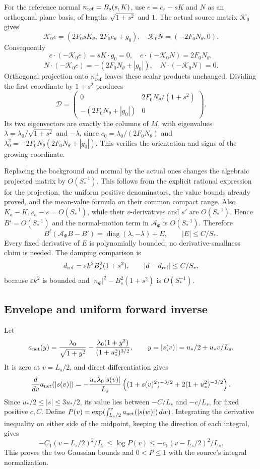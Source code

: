 \documentclass[10pt,a4paper]{article}
\begin{document}
For the reference normal \(n_{\rm ref}=B_s(s,K)\), use \(e=e_r-sK\) and \(N\) as an orthogonal plane basis, of lengths \(\sqrt{1+s^2}\) and \(1\). The actual source matrix \(\mathcal K_0\) gives \[
\mathcal K_0e=(2F_0sK_\theta,\ 2F_0e_\theta+g_0),\quad
\mathcal K_0N=(-2F_0N_\theta,0).
\] Consequently \[
e\cdot(-\mathcal K_0e)=sK\cdot g_0=0,\quad
e\cdot(-\mathcal K_0N)=2F_0N_\theta,
\] \[
N\cdot(-\mathcal K_0e)=-(2F_0N_\theta+|g_0|),\quad
N\cdot(-\mathcal K_0N)=0.
\] Orthogonal projection onto \(n_{\rm ref}^\perp\) leaves these scalar products unchanged. Dividing the first coordinate by \(1+s^2\) produces \[
\mathcal D=
\begin{pmatrix}
0&2F_0N_\theta/(1+s^2)\\
-(2F_0N_\theta+|g_0|)&0
\end{pmatrix}.
\] Its two eigenvectors are exactly the columns of \(M\), with eigenvalues \(\lambda=\lambda_0/\sqrt{1+s^2}\) and \(-\lambda\), since \(c_0=\lambda_0/(2F_0N_\theta)\) and \(\lambda_0^2=-2F_0N_\theta(2F_0N_\theta+|g_0|)\). This verifies the orientation and signs of the growing coordinate.

Replacing the background and normal by the actual ones changes the algebraic projected matrix by \(O(S_*^{-1})\). This follows from the explicit rational expression for the projection, the uniform positive denominators, the value bounds already proved, and the mean-value formula on their common compact range. Also \(K_a-K,s_a-s=O(S_*^{-1})\), while their \(v\)-derivatives and \(s'\) are \(O(S_*^{-1})\). Hence \(B'=O(S_*^{-1})\) and the normal-motion term in \(\mathcal A_\Phi\) is \(O(S_*^{-1})\). Therefore \[
B^\ell(\mathcal A_\Phi B-B')=
\operatorname{diag}(\lambda,-\lambda)+E,\qquad |E|\le C/S_*.
\] Every fixed derivative of \(E\) is polynomially bounded; no derivative-smallness claim is needed. The damping comparison is \[
d_{\rm ref}=\varepsilon k^2B_s^2(1+s^2),\qquad
|d-d_{\rm ref}|\le C/S_*,
\] because \(\varepsilon k^2\) is bounded and \(|n_\Phi|^2-B_s^2(1+s^2)\) is \(O(S_*^{-1})\).

\subsection{Envelope and uniform forward inverse}\label{si:envelope-and-uniform-forward-inverse}

Let \[
a_{\rm net}(y)=\frac{\lambda_0}{\sqrt{1+y^2}}-
\frac{\lambda_0(1+y^2)}{(1+u_*^2)^{3/2}},
\qquad y=|s(v)|=u_*/2+u_*v/L_s.
\] It is zero at \(v=L_s/2\), and direct differentiation gives \[
\frac{d}{dv}a_{\rm net}(|s(v)|)
=-\frac{u_*\lambda_0|s(v)|}{L_s}
\left((1+s(v)^2)^{-3/2}+2(1+u_*^2)^{-3/2}\right).
\] Since \(u_*/2\le|s|\le3u_*/2\), its value lies between \(-C/L_s\) and \(-c/L_s\), for fixed positive \(c,C\). Define \(P(v)=\exp(\int_{L_s/2}^v a_{\rm net}(|s(w)|)\,dw)\). Integrating the derivative inequality on either side of the midpoint, keeping the direction of each integral, gives \[
-C_1(v-L_s/2)^2/L_s\le\log P(v)\le-c_1(v-L_s/2)^2/L_s.
\] This proves the two Gaussian bounds and \(0<P\le1\) with the source's integral normalization.
\end{document}
